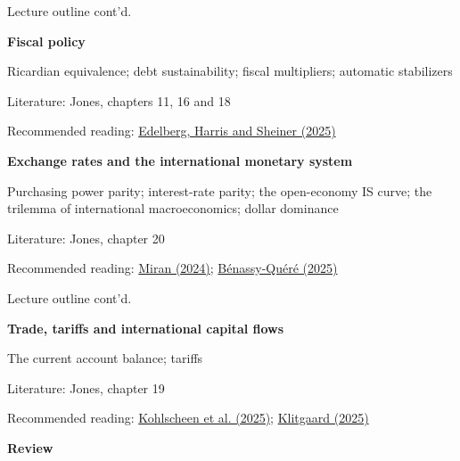 \documentclass[10pt,handout]{beamer}
\begin{document}
\begin{frame}{Lecture outline cont'd.}
\begin{itemize}
    \item [L9.] \textbf{Fiscal policy}
    \small{
    \item[] Ricardian equivalence; debt sustainability; fiscal multipliers; automatic stabilizers
    \item[] Literature: Jones, chapters 11, 16 and 18
    \item[] Recommended reading: \href{https://www.brookings.edu/wp-content/uploads/2025/02/20240212_ES_EdelbergHarrisSheiner_Debt_final1.pdf}{Edelberg, Harris and Sheiner (2025)}
    }
\end{itemize}

\bigskip

\begin{itemize}
    \item [L10.] \textbf{Exchange rates and the international monetary system}
    \small{    
    \item[] Purchasing power parity; interest-rate parity; the open-economy IS curve; the trilemma of international macroeconomics; dollar dominance
    \item[] Literature: Jones, chapter 20
    \item[] Recommended reading: \href{https://www.hudsonbaycapital.com/documents/FG/hudsonbay/research/638199_A_Users_Guide_to_Restructuring_the_Global_Trading_System.pdf}{Miran (2024)}; \href{https://www.banque-france.fr/en/governors-interventions/international-monetary-system-unfair}{Bénassy-Quéré (2025)} 
    }
\end{itemize}
\end{frame}



\begin{frame}{Lecture outline cont'd.}
\begin{itemize}
    \item [L11.] \textbf{Trade, tariffs and international capital flows}
    \small{    
    \item[] The current account balance; tariffs
    \item[] Literature: Jones, chapter 19
    \item[] Recommended reading: \href{https://www.bis.org/publ/bisbull110.pdf}{Kohlscheen et al. (2025)}; \href{https://libertystreeteconomics.newyorkfed.org/2025/05/why-does-the-u-s-always-run-a-trade-deficit/}{Klitgaard (2025)}
    }
\end{itemize}

\bigskip

\begin{itemize}
\small{
\item [L12.] \textbf{Review} 
}
\end{itemize}
\end{frame}
\end{document}
